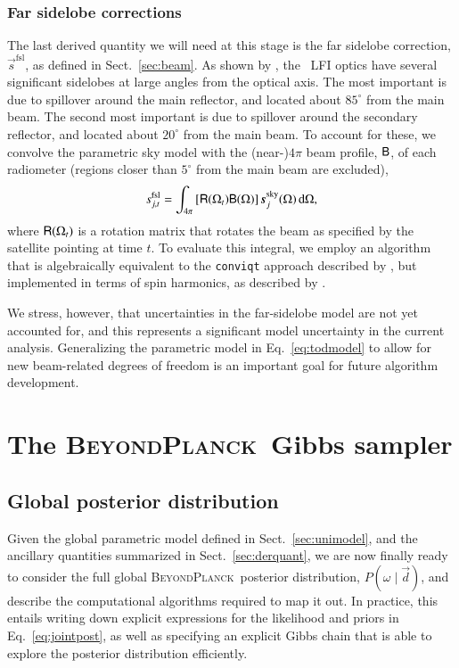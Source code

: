 \documentclass[onecolumn]{aa}
\renewcommand{\d}[0]{\vec{d}}
\newcommand{\s}[0]{\vec{s}}
\newcommand{\B}[0]{\tens{B}}
\newcommand{\R}[0]{\tens{R}}
\newcommand{\BP}{\textsc{BeyondPlanck}}
\begin{document}
\subsubsection{Far sidelobe corrections}
\label{sec:fsl}

The last derived quantity we will need at this stage is the far
sidelobe correction, $\s^{\mathrm{fsl}}$, as defined in
Sect.~\ref{sec:beam}. As shown by \citet{planck2014-a05}, the
\Planck\ LFI optics have several significant sidelobes at large angles
from the optical axis.  The most important is due to spillover around
the main reflector, and located about $85^{\circ}$ from the main
beam. The second most important is due to spillover around the
secondary reflector, and located about $20^{\circ}$ from the main
beam. To account for these, we convolve the parametric sky model with
the (near-)$4\pi$ beam profile, $\B$, of each radiometer (regions
closer than $5^{\circ}$ from the main beam are excluded),
\begin{equation}
  s^{\mathrm{fsl}}_{j,t} = \int_{4\pi} \left[\R(\Omega_t)\B(\Omega) \right]\s^{\mathrm{sky}}_j(\Omega)
  \,\mathrm d\Omega,
\end{equation}
where $\R(\Omega_t)$ is a rotation matrix that rotates the beam as
specified by the satellite pointing at time $t$.  To evaluate this
integral, we employ an algorithm that is algebraically equivalent to
the \texttt{conviqt} approach described by \citet{prezeau:2010}, but
implemented in terms of spin harmonics, as described by
\citet{bp08}.

We stress, however, that uncertainties in the far-sidelobe model are
not yet accounted for, and this represents a significant model
uncertainty in the current analysis. Generalizing the parametric model
in Eq.~\eqref{eq:todmodel} to allow for new beam-related degrees of
freedom is an important goal for future algorithm development.

\section{The \BP\ Gibbs sampler}
\label{sec:posterior}

\subsection{Global posterior distribution}

Given the global parametric model defined in Sect.~\ref{sec:unimodel},
and the ancillary quantities summarized in Sect.~\ref{sec:derquant},
we are now finally ready to consider the full global \BP\ posterior
distribution, $P(\omega\mid \d)$, and describe the computational
algorithms required to map it out. In practice, this entails writing
down explicit expressions for the likelihood and priors in
Eq.~\eqref{eq:jointpost}, as well as specifying an explicit Gibbs chain
that is able to explore the posterior distribution efficiently.
\end{document}
